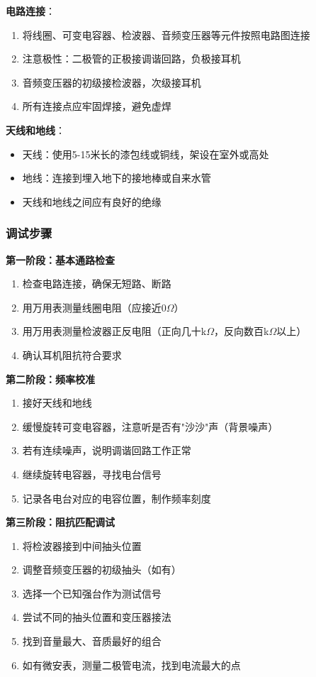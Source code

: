 \textbf{电路连接}：
\begin{enumerate}
    \item 将线圈、可变电容器、检波器、音频变压器等元件按照电路图连接
    \item 注意极性：二极管的正极接调谐回路，负极接耳机
    \item 音频变压器的初级接检波器，次级接耳机
    \item 所有连接点应牢固焊接，避免虚焊
\end{enumerate}

\textbf{天线和地线}：
\begin{itemize}
    \item 天线：使用5-15米长的漆包线或铜线，架设在室外或高处
    \item 地线：连接到埋入地下的接地棒或自来水管
    \item 天线和地线之间应有良好的绝缘
\end{itemize}

\subsubsection{调试步骤}
\label{sec:crystal_radio_debug}

\textbf{第一阶段：基本通路检查}
\begin{enumerate}
    \item 检查电路连接，确保无短路、断路
    \item 用万用表测量线圈电阻（应接近0$\Omega$）
    \item 用万用表测量检波器正反电阻（正向几十k$\Omega$，反向数百k$\Omega$以上）
    \item 确认耳机阻抗符合要求
\end{enumerate}

\textbf{第二阶段：频率校准}
\begin{enumerate}
    \item 接好天线和地线
    \item 缓慢旋转可变电容器，注意听是否有"沙沙"声（背景噪声）
    \item 若有连续噪声，说明调谐回路工作正常
    \item 继续旋转电容器，寻找电台信号
    \item 记录各电台对应的电容位置，制作频率刻度
\end{enumerate}

\textbf{第三阶段：阻抗匹配调试}
\begin{enumerate}
    \item 将检波器接到中间抽头位置
    \item 调整音频变压器的初级抽头（如有）
    \item 选择一个已知强台作为测试信号
    \item 尝试不同的抽头位置和变压器接法
    \item 找到音量最大、音质最好的组合
    \item 如有微安表，测量二极管电流，找到电流最大的点
\end{enumerate}

